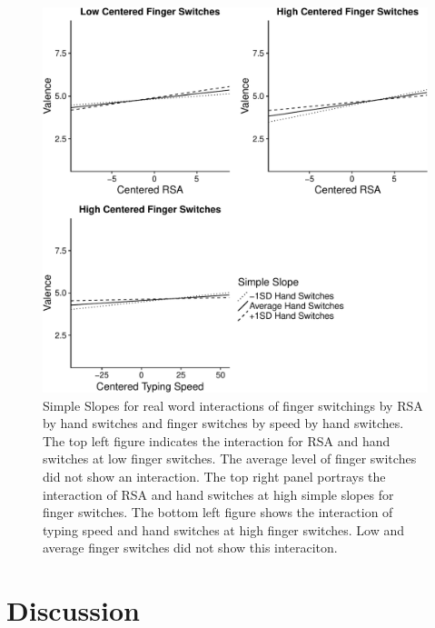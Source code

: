 \documentclass[english,man]{apa6}
\theoremstyle{definition}
\theoremstyle{definition}
\theoremstyle{definition}
\theoremstyle{remark}
\begin{document}
\begin{figure}
\centering
\includegraphics{QWERTY_files/figure-latex/graphs2-1.pdf}
\caption{\label{fig:graphs2}Simple Slopes for real word interactions of
finger switchings by RSA by hand switches and finger switches by speed
by hand switches. The top left figure indicates the interaction for RSA
and hand switches at low finger switches. The average level of finger
switches did not show an interaction. The top right panel portrays the
interaction of RSA and hand switches at high simple slopes for finger
switches. The bottom left figure shows the interaction of typing speed
and hand switches at high finger switches. Low and average finger
switches did not show this interaciton.}
\end{figure}

\section{Discussion}\label{discussion}
\end{document}
